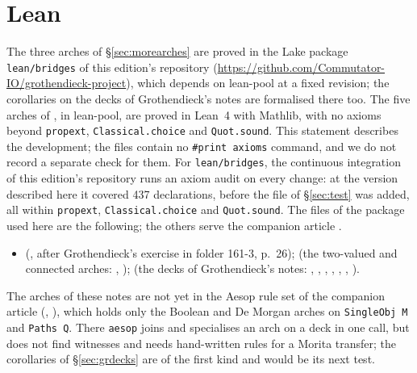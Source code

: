 \section{Lean}\label{sec:nlean}

The three arches of \S\ref{sec:morearches} are proved in the Lake package \texttt{lean/bridges} of this edition's repository (\url{https://github.com/Commutator-IO/grothendieck-project}), which depends on lean-pool at a fixed revision; the corollaries on the decks of Grothendieck's notes are formalised there too. The five arches of \lp{}, in lean-pool, are proved in Lean~4 with Mathlib, with no axioms beyond \texttt{propext}, \texttt{Classical.choice} and \texttt{Quot.sound}. This statement describes the development; the files contain no \texttt{\#print axioms} command, and we do not record a separate check for them. For \texttt{lean/bridges}, the continuous integration of this edition's repository runs an axiom audit on every change: at the version described here it covered 437 declarations, before the file  of \S\ref{sec:test} was added, all within \texttt{propext}, \texttt{Classical.choice} and \texttt{Quot.sound}. The files of the package used here are the following; the others serve the companion article \cite{bridges-generator}.
\begin{itemize}
\item {} (, after Grothendieck's exercise in folder 161-3, p.~26);  (the two-valued and connected arches: , );  (the decks of Grothendieck's notes: , , , , , , ).
\end{itemize}
The arches of these notes are not yet in the Aesop rule set of the companion article (, \cite[\S\,Limits]{bridges-generator}), which holds only the Boolean and De Morgan arches on \texttt{SingleObj M} and \texttt{Paths Q}. There \texttt{aesop} joins and specialises an arch on a deck in one call, but does not find witnesses and needs hand-written rules for a Morita transfer; the corollaries of \S\ref{sec:grdecks} are of the first kind and would be its next test.


